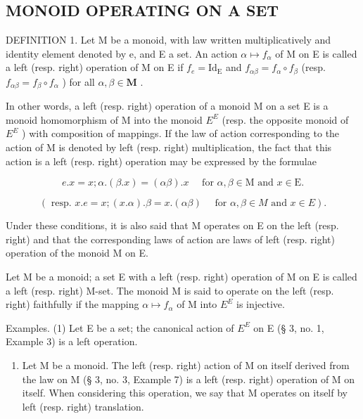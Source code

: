 \subsection{MONOID OPERATING ON A SET}

DEFINITION 1. Let M be a monoid, with law written multiplicatively and identity element denoted by e, and E a set. An action \(\alpha \mapsto f_{\alpha}\) of M on E is called a left (resp. right) operation of M on E if \(f_{e} = \mathrm{Id}_{\mathrm{E}}\) and \(f_{\alpha \beta} = f_{\alpha} \circ f_{\beta}\) (resp. \(f_{\alpha \beta} = f_{\beta} \circ f_{\alpha}\) ) for all \(\alpha, \beta \in \mathbf{M}\) .

In other words, a left (resp. right) operation of a monoid M on a set E is a monoid homomorphism of M into the monoid \(E^{E}\) (resp. the opposite monoid of \(E^{E}\) ) with composition of mappings. If the law of action corresponding to the action of M is denoted by left (resp. right) multiplication, the fact that this action is a left (resp. right) operation may be expressed by the formulae

\[
e. x = x; \alpha . (\beta . x) = (\alpha \beta). x \quad \text { for } \alpha , \beta \in \mathrm{M} \text { and } x \in \mathrm{E}.\tag{1}
\]

\[
(\text { resp. } x. e = x; (x. \alpha). \beta = x. (\alpha \beta) \quad \text { for } \alpha , \beta \in M \text { and } x \in E).
\]

Under these conditions, it is also said that M operates on E on the left (resp. right) and that the corresponding laws of action are laws of left (resp. right) operation of the monoid M on E.

Let M be a monoid; a set E with a left (resp. right) operation of M on E is called a left (resp. right) M-set. The monoid M is said to operate on the left (resp. right) faithfully if the mapping \(\alpha \mapsto f_{\alpha}\) of M into \(E^{E}\) is injective.

Examples. (1) Let E be a set; the canonical action of \(E^{E}\) on E (§ 3, no. 1, Example 3) is a left operation.

\begin{enumerate}
\def\labelenumi{(\arabic{enumi})}
\setcounter{enumi}{1}
\tightlist
\item
  Let M be a monoid. The left (resp. right) action of M on itself derived from the law on M (§ 3, no. 3, Example 7) is a left (resp. right) operation of M on itself. When considering this operation, we say that M operates on itself by left (resp. right) translation.
\end{enumerate}

